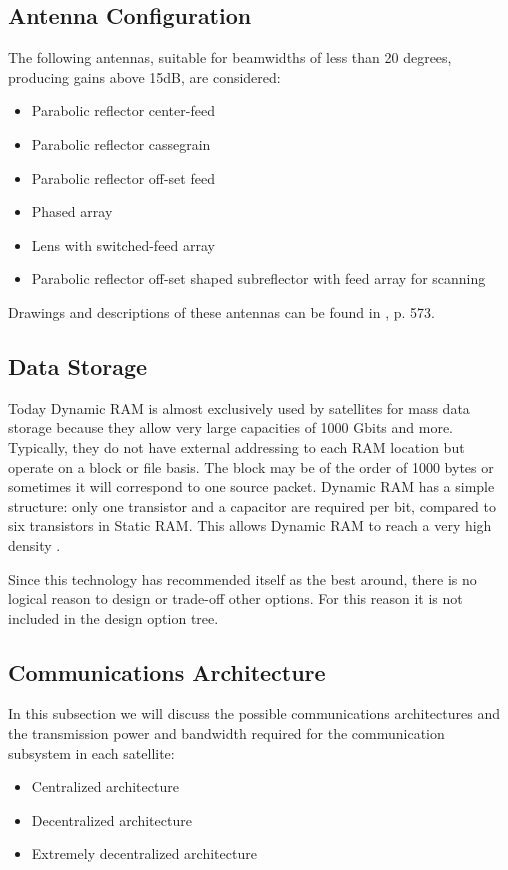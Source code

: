 \subsection{Antenna Configuration}
The following antennas, suitable for beamwidths of less than 20 degrees, producing gains above 15dB, are considered:
\begin{itemize}
\item Parabolic reflector center-feed
\item Parabolic reflector cassegrain
\item Parabolic reflector off-set feed
\item Phased array
\item Lens with switched-feed array
\item Parabolic reflector off-set shaped subreflector with feed array for scanning
\end{itemize}

Drawings and descriptions of these antennas can be found in \cite{larson}, p. 573.

\subsection{Data Storage}
Today Dynamic RAM is almost exclusively used by satellites for mass data storage because they allow very large capacities of 1000 Gbits and more. Typically, they do not have external addressing to each RAM location but operate on a block or file basis. The block may be of the order of 1000 bytes or sometimes it will correspond to one source packet. Dynamic RAM has a simple structure: only one transistor and a capacitor are required per bit, compared to six transistors in Static RAM. This allows Dynamic RAM to reach a very high density \cite{sse}.

Since this technology has recommended itself as the best around, there is no logical reason to design or trade-off other options. For this reason it is not included in the design option tree.

\subsection{Communications Architecture}
In this subsection we will discuss the possible communications architectures and the transmission power and bandwidth required for the communication subsystem in each satellite:
\begin{itemize}
\item Centralized architecture
\item Decentralized architecture
\item Extremely decentralized architecture
\end{itemize}


